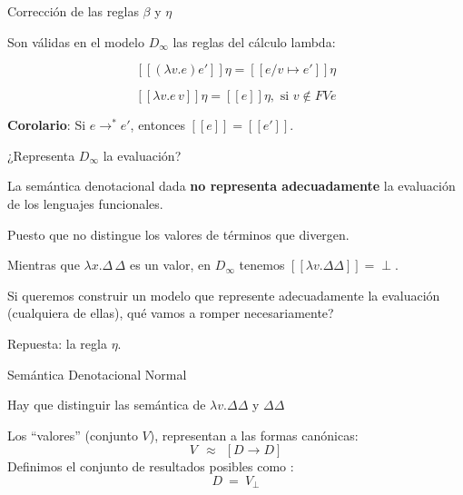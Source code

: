 \documentclass[handout]{beamer}
\newcommand{\se}[1]{\mbox{$[\![#1]\!]$}}
\begin{document}
\begin{frame}{Corrección de las reglas $\beta$ y $\eta$}
  
Son válidas en el modelo $D_\infty$ las reglas del cálculo lambda:

\bigskip

\[ \se{(\lambda v.e)e'}\eta = \se{e/v\mapsto e'}\eta \]
\pause
\bigskip

\[\se{\lambda v.e\,v}\eta = \se{e}\eta, \text{ si } v\notin FV e \]
\pause
\bigskip

\textbf{Corolario}: Si $e \rightarrow^\ast e'$, entonces $\se{e} = \se{e'}$.

\end{frame}



\begin{frame}{¿Representa $D_\infty$ la evaluación?}

La semántica denotacional dada \textbf{ no representa adecuadamente}
la evaluación de los lenguajes funcionales.
\pause

\bigskip
Puesto que no distingue los valores de términos que divergen.   
\medskip

Mientras que $\lambda x. \Delta\,\Delta$ es un valor, en $D_\infty$
tenemos $\se{\lambda v. \Delta\Delta} = \perp$.
\pause
\medskip

Si queremos construir un modelo que represente adecuadamente la
evaluación (cualquiera de ellas), qué vamos a romper necesariamente?
\pause

Repuesta: la regla $\eta$.

\end{frame}



\begin{frame}{Semántica Denotacional Normal}

Hay que distinguir las semántica de $\lambda v. \Delta\Delta$ y $\Delta\Delta$
\pause
\bigskip

Los ``valores'' (conjunto $V$), representan a las formas canónicas:
\[ V\ \ \approx\ \  [D\rightarrow D]\]
\pause
Definimos el conjunto de resultados posibles como :
\[D \ =\ V_\perp\]

\end{frame}
\end{document}
